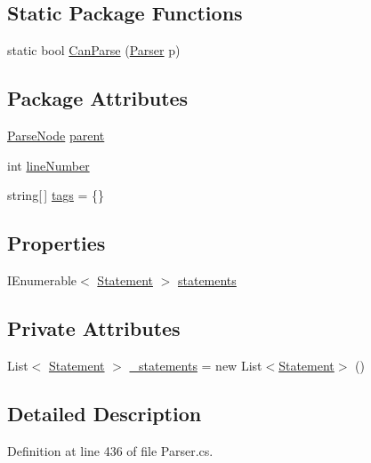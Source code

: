 \subsection*{Static Package Functions}
\begin{DoxyCompactItemize}
\item 
static bool \hyperlink{a00043_a7fa97243e2a807c2255988547d31cac7}{Can\-Parse} (\hyperlink{a00149}{Parser} p)
\end{DoxyCompactItemize}
\subsection*{Package Attributes}
\begin{DoxyCompactItemize}
\item 
\hyperlink{a00148}{Parse\-Node} \hyperlink{a00148_af313a82103fcc2ff5a177dbb06b92f7b}{parent}
\item 
int \hyperlink{a00148_a18b493382de0fde5b4299c1bd2250075}{line\-Number}
\item 
string\mbox{[}$\,$\mbox{]} \hyperlink{a00148_a58b3a15788fd2d4127d73619dc6d04ae}{tags} = \{\}
\end{DoxyCompactItemize}
\subsection*{Properties}
\begin{DoxyCompactItemize}
\item 
I\-Enumerable$<$ \hyperlink{a00166}{Statement} $>$ \hyperlink{a00043_a42e3d555bbd5ecbdf61c45ad715be7e1}{statements}
\end{DoxyCompactItemize}
\subsection*{Private Attributes}
\begin{DoxyCompactItemize}
\item 
List$<$ \hyperlink{a00166}{Statement} $>$ \hyperlink{a00043_ad79f9582e55ec75b68fd72ffcae0f41b}{\-\_\-statements} = new List$<$\hyperlink{a00166}{Statement}$>$ ()
\end{DoxyCompactItemize}


\subsection{Detailed Description}


Definition at line 436 of file Parser.\-cs.



